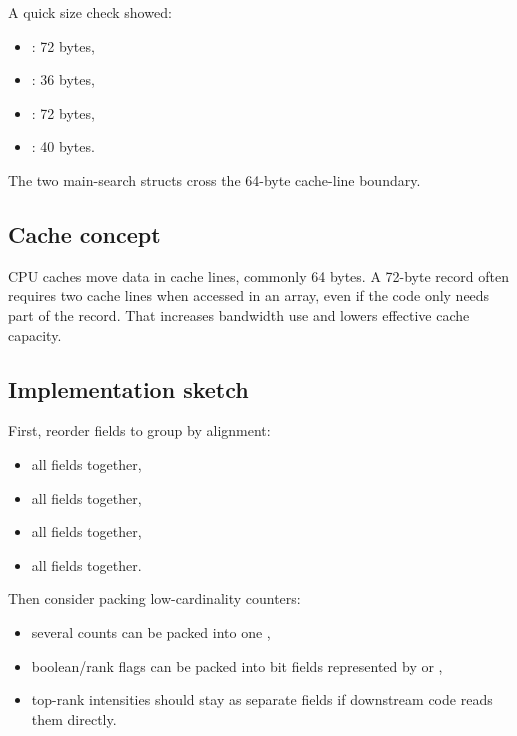 \documentclass[11pt]{article}
\begin{document}
A quick size check showed:

\begin{itemize}
  \item {}: 72 bytes,
  \item {}: 36 bytes,
  \item {}: 72 bytes,
  \item {}: 40 bytes.
\end{itemize}

The two main-search structs cross the 64-byte cache-line boundary.

\subsection*{Cache concept}

CPU caches move data in cache lines, commonly 64 bytes. A 72-byte record often
requires two cache lines when accessed in an array, even if the code only needs
part of the record. That increases bandwidth use and lowers effective cache
capacity.

\subsection*{Implementation sketch}

First, reorder fields to group by alignment:

\begin{itemize}
  \item all  fields together,
  \item all  fields together,
  \item all  fields together,
  \item all  fields together.
\end{itemize}

Then consider packing low-cardinality counters:

\begin{itemize}
  \item several  counts can be packed into one ,
  \item boolean/rank flags can be packed into bit fields represented by
         or ,
  \item top-rank intensities should stay as separate  fields if
        downstream code reads them directly.
\end{itemize}
\end{document}
